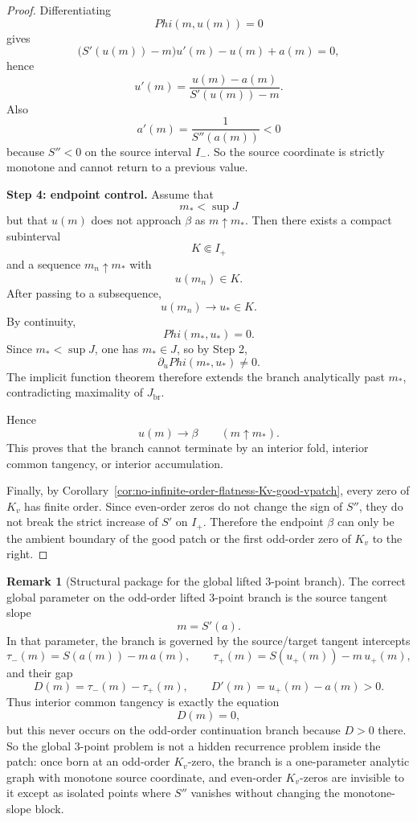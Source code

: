 \documentclass[11pt,a4paper]{amsart}
\def\Phi{Phi}%
\theoremstyle{plain}
\theoremstyle{definition}
\newtheorem{remark}[theorem]{Remark}
\begin{document}
\begin{proof}
Differentiating
\[
\Phi(m,u(m))=0
\]
gives
\[
\bigl(S'(u(m))-m\bigr)u'(m)-u(m)+a(m)=0,
\]
hence
\[
u'(m)=\frac{u(m)-a(m)}{S'(u(m))-m}.
\]
Also
\[
a'(m)=\frac{1}{S''(a(m))}<0
\]
because $S''<0$ on the source interval $I_-$. So the source coordinate is
strictly monotone and cannot return to a previous value.

\smallskip

\noindent
\textbf{Step 4: endpoint control.}
Assume that
\[
m_*<\sup J
\]
but that $u(m)$ does not approach $\beta$ as $m\uparrow m_*$. Then there exists
a compact subinterval
\[
K\Subset I_+
\]
and a sequence $m_n\uparrow m_*$ with
\[
u(m_n)\in K.
\]
After passing to a subsequence,
\[
u(m_n)\to u_*\in K.
\]
By continuity,
\[
\Phi(m_*,u_*)=0.
\]
Since $m_*<\sup J$, one has $m_*\in J$, so by Step 2,
\[
\partial_u\Phi(m_*,u_*)\neq 0.
\]
The implicit function theorem therefore extends the branch analytically past
$m_*$, contradicting maximality of $J_{\mathrm{br}}$.

Hence
\[
u(m)\to\beta
\qquad (m\uparrow m_*).
\]
This proves that the branch cannot terminate by an interior fold, interior
common tangency, or interior accumulation.

Finally, by
Corollary~\ref{cor:no-infinite-order-flatness-Kv-good-vpatch}, every zero of
$K_v$ has finite order. Since even-order zeros do not change the sign of $S''$,
they do not break the strict increase of $S'$ on $I_+$. Therefore the endpoint
$\beta$ can only be the ambient boundary of the good patch or the first
odd-order zero of $K_v$ to the right.
\end{proof}

\begin{remark}[Structural package for the global lifted $3$-point branch]
\label{rem:structural-package-global-lifted-three-point-branch}
The correct global parameter on the odd-order lifted $3$-point branch is the
source tangent slope
\[
m=S'(a).
\]
In that parameter, the branch is governed by the source/target tangent
intercepts
\[
\tau_-(m)=S(a(m))-m\,a(m),
\qquad
\tau_+(m)=S(u_+(m))-m\,u_+(m),
\]
and their gap
\[
D(m)=\tau_-(m)-\tau_+(m),
\qquad
D'(m)=u_+(m)-a(m)>0.
\]
Thus interior common tangency is exactly the equation
\[
D(m)=0,
\]
but this never occurs on the odd-order continuation branch because $D>0$ there.
So the global $3$-point problem is not a hidden recurrence problem inside the
patch: once born at an odd-order $K_v$-zero, the branch is a one-parameter
analytic graph with monotone source coordinate, and even-order $K_v$-zeros are
invisible to it except as isolated points where $S''$ vanishes without changing
the monotone-slope block.
\end{remark}
\end{document}
